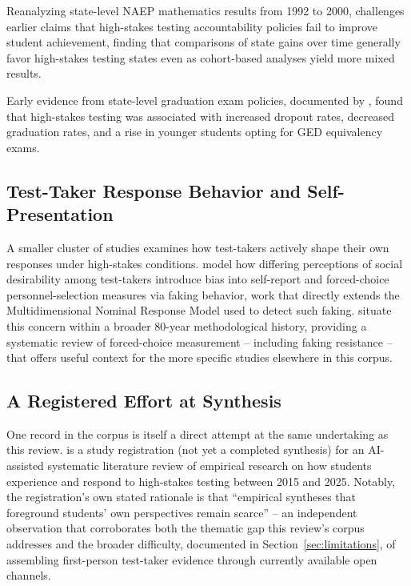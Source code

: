\documentclass[11pt]{article}
\begin{document}
Reanalyzing state-level NAEP mathematics results from 1992 to 2000, \citet{braun2004highstakes} challenges earlier claims that high-stakes testing accountability policies fail to improve student achievement, finding that comparisons of state gains over time generally favor high-stakes testing states even as cohort-based analyses yield more mixed results.

Early evidence from state-level graduation exam policies, documented by \citet{amreinbeardsley2002unintended}, found that high-stakes testing was associated with increased dropout rates, decreased graduation rates, and a rise in younger students opting for GED equivalency exams.

\subsection{Test-Taker Response Behavior and Self-Presentation}

A smaller cluster of studies examines how test-takers actively shape their own responses under high-stakes conditions. \citet{kleinbub2026socialdesirability} model how differing perceptions of social desirability among test-takers introduce bias into self-report and forced-choice personnel-selection measures via faking behavior, work that directly extends the Multidimensional Nominal Response Model used to detect such faking. \citet{lee2025forcedchoice} situate this concern within a broader 80-year methodological history, providing a systematic review of forced-choice measurement -- including faking resistance -- that offers useful context for the more specific studies elsewhere in this corpus.

\subsection{A Registered Effort at Synthesis}

One record in the corpus is itself a direct attempt at the same undertaking as this review. \citet{kaleta2025studentperspectives} is a study registration (not yet a completed synthesis) for an AI-assisted systematic literature review of empirical research on how students experience and respond to high-stakes testing between 2015 and 2025. Notably, the registration's own stated rationale is that ``empirical syntheses that foreground students' own perspectives remain scarce'' -- an independent observation that corroborates both the thematic gap this review's corpus addresses and the broader difficulty, documented in Section~\ref{sec:limitations}, of assembling first-person test-taker evidence through currently available open channels.
\end{document}
